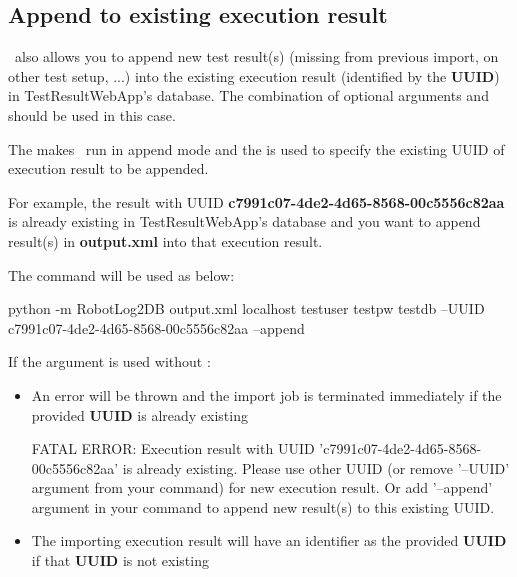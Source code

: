   \subsection{Append to existing execution result}\label{append-to-existing-execution-result}
    \pkg\ also allows you to append new test result(s) (missing from previous
    import, on other test setup, ...) into the existing execution result
    (identified by the \textbf{UUID}) in TestResultWebApp's database.
    The combination of optional arguments  and
     should be used in this case.

    The  makes \pkg\ run in append mode and the 
    is used to specify the existing UUID of execution result to be appended.

    For example, the result with UUID \textbf{c7991c07-4de2-4d65-8568-00c5556c82aa}
    is already existing in TestResultWebApp's database and you want to append
    result(s) in \textbf{output.xml} into that execution result.

    The command will be used as below:
\begin{robotlog}
python -m RobotLog2DB output.xml localhost testuser testpw testdb --UUID c7991c07-4de2-4d65-8568-00c5556c82aa --append
\end{robotlog}

    If the argument  is used without :
    \begin{itemize}
      \item An error will be thrown and the import job is terminated immediately
            if the provided \textbf{UUID} is already existing

\begin{robotlog}
FATAL ERROR: Execution result with UUID 'c7991c07-4de2-4d65-8568-00c5556c82aa' is already existing.
             Please use other UUID (or remove '--UUID' argument from your command) for new execution result.
             Or add '--append' argument in your command to append new result(s) to this existing UUID.
\end{robotlog}
      \item The importing execution result will have an identifier as the
            provided \textbf{UUID} if that \textbf{UUID} is not existing
    \end{itemize}

